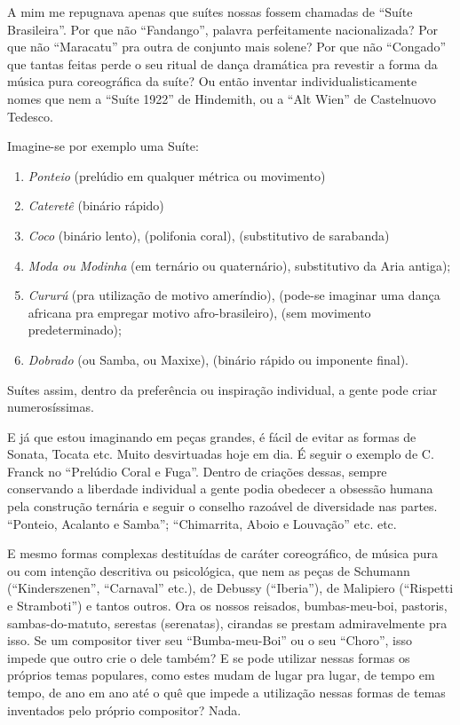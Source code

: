 A mim me repugnava apenas que suítes nossas fossem chamadas de ``Suíte
Brasileira''. Por que não ``Fandango'', palavra perfeitamente
nacionalizada? Por que não ``Maracatu'' pra outra de conjunto mais solene?
Por que não ``Congado'' que tantas feitas perde o seu ritual de dança
dramática pra revestir a forma da música pura coreográfica da suíte? Ou
então inventar individualisticamente nomes que nem a ``Suíte 1922'' de
Hindemith, ou a ``Alt Wien'' de Castelnuovo Tedesco.

Imagine-se por exemplo uma Suíte:

\begin{enumerate}
\item\emph{Ponteio} (prelúdio em qualquer métrica ou movimento)

\item\emph{Cateretê} (binário rápido)

\item\emph{Coco} (binário lento), (polifonia coral), (substitutivo de sarabanda)

\item\emph{Moda ou Modinha} (em ternário ou quaternário), substitutivo da Aria antiga);

\item\emph{Cururú} (pra utilização de motivo ameríndio), (pode-se imaginar
  uma dança africana pra empregar motivo afro-brasileiro), (sem
  movimento predeterminado);

\item\emph{Dobrado} (ou Samba, ou Maxixe), (binário rápido ou imponente final).
\end{enumerate}

Suítes assim, dentro da preferência ou inspiração individual, a gente
pode criar numerosíssimas.

E já que estou imaginando em peças grandes, é fácil de evitar as formas
de Sonata, Tocata etc. Muito desvirtuadas hoje em dia. É seguir o
exemplo de C. Franck no ``Prelúdio Coral e Fuga''. Dentro de criações
dessas, sempre conservando a liberdade individual a gente podia obedecer
a obsessão humana pela construção ternária e seguir o conselho razoável
de diversidade nas partes. ``Ponteio, Acalanto e Samba''; ``Chimarrita,
Aboio e Louvação'' etc. etc.

E mesmo formas complexas destituídas de caráter coreográfico, de música
pura ou com intenção descritiva ou psicológica, que nem as peças de
Schumann (``Kinderszenen'', ``Carnaval'' etc.), de Debussy (``Iberia''), de
Malipiero (``Rispetti e Stramboti'') e tantos outros. Ora os nossos
reisados, bumbas-meu-boi, pastoris, sambas-do-matuto, serestas
(serenatas), cirandas se prestam admiravelmente pra isso. Se um
compositor tiver seu ``Bumba-meu-Boi'' ou o seu ``Choro'', isso impede que
outro crie o dele também? E se pode utilizar nessas formas os próprios
temas populares, como estes mudam de lugar pra lugar, de tempo em tempo,
de ano em ano até o quê que impede a utilização nessas formas de temas
inventados pelo próprio compositor? Nada.

